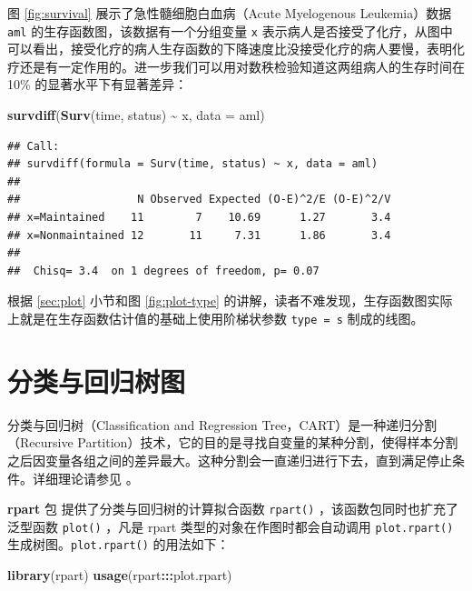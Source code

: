 \documentclass[
  b5paper,
  UTF8,twoside]{book}
\newenvironment{Shaded}{\begin{snugshade}}{\end{snugshade}}
\newcommand{\AttributeTok}[1]{\textcolor[rgb]{0.13,0.29,0.53}{#1}}
\newcommand{\FunctionTok}[1]{\textcolor[rgb]{0.13,0.29,0.53}{\textbf{#1}}}
\newcommand{\NormalTok}[1]{#1}
\newcommand{\SpecialCharTok}[1]{\textcolor[rgb]{0.81,0.36,0.00}{\textbf{#1}}}
\begin{document}
图 \ref{fig:survival} 展示了急性髓细胞白血病（Acute Myelogenous Leukemia）数据 \texttt{aml} 的生存函数图，该数据有一个分组变量 \texttt{x} 表示病人是否接受了化疗，从图中可以看出，接受化疗的病人生存函数的下降速度比没接受化疗的病人要慢，表明化疗还是有一定作用的。进一步我们可以用对数秩检验知道这两组病人的生存时间在 10\% 的显著水平下有显著差异：

\begin{Shaded}
\begin{Highlighting}[]
\FunctionTok{survdiff}\NormalTok{(}\FunctionTok{Surv}\NormalTok{(time, status) }\SpecialCharTok{\textasciitilde{}}\NormalTok{ x, }\AttributeTok{data =}\NormalTok{ aml)}
\end{Highlighting}
\end{Shaded}

\begin{verbatim}
## Call:
## survdiff(formula = Surv(time, status) ~ x, data = aml)
## 
##                  N Observed Expected (O-E)^2/E (O-E)^2/V
## x=Maintained    11        7    10.69      1.27       3.4
## x=Nonmaintained 12       11     7.31      1.86       3.4
## 
##  Chisq= 3.4  on 1 degrees of freedom, p= 0.07
\end{verbatim}

根据 \ref{sec:plot} 小节和图 \ref{fig:plot-type}
的讲解，读者不难发现，生存函数图实际上就是在生存函数估计值的基础上使用阶梯状参数 \texttt{type\ =\ \textquotesingle{}s\textquotesingle{}} 制成的线图。

\section{分类与回归树图}\label{sec:rpart}

分类与回归树（Classification and Regression Tree，CART）是一种递归分割（Recursive Partition）技术，它的目的是寻找自变量的某种分割，使得样本分割之后因变量各组之间的差异最大。这种分割会一直递归进行下去，直到满足停止条件。详细理论请参见 \citet{Breiman84}。

\textbf{rpart} 包 \citep{rpart} 提供了分类与回归树的计算拟合函数 \texttt{rpart()} ，该函数包同时也扩充了泛型函数 \texttt{plot()} ，凡是 rpart 类型的对象在作图时都会自动调用 \texttt{plot.rpart()} 生成树图。\texttt{plot.rpart()} 的用法如下：

\begin{Shaded}
\begin{Highlighting}[]
\FunctionTok{library}\NormalTok{(rpart)}
\FunctionTok{usage}\NormalTok{(rpart}\SpecialCharTok{:::}\NormalTok{plot.rpart)}
\end{Highlighting}
\end{Shaded}
\end{document}
